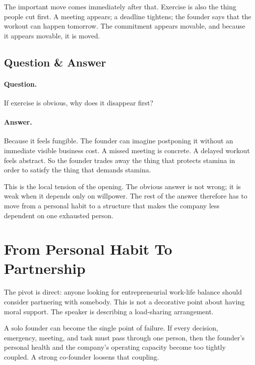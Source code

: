 The important move comes immediately after that. Exercise is also the thing people cut first. A meeting appears; a deadline tightens; the founder says that the workout can happen tomorrow. The commitment appears movable, and because it appears movable, it is moved.

\subsection{Question \& Answer}

\paragraph{Question.}
If exercise is obvious, why does it disappear first?

\paragraph{Answer.}
Because it feels fungible. The founder can imagine postponing it without an immediate visible business cost. A missed meeting is concrete. A delayed workout feels abstract. So the founder trades away the thing that protects stamina in order to satisfy the thing that demands stamina.

This is the local tension of the opening. The obvious answer is not wrong; it is weak when it depends only on willpower. The rest of the answer therefore has to move from a personal habit to a structure that makes the company less dependent on one exhausted person.

\section{From Personal Habit To Partnership}

The pivot is direct: anyone looking for entrepreneurial work-life balance should consider partnering with somebody. This is not a decorative point about having moral support. The speaker is describing a load-sharing arrangement.

A solo founder can become the single point of failure. If every decision, emergency, meeting, and task must pass through one person, then the founder's personal health and the company's operating capacity become too tightly coupled. A strong co-founder loosens that coupling.

